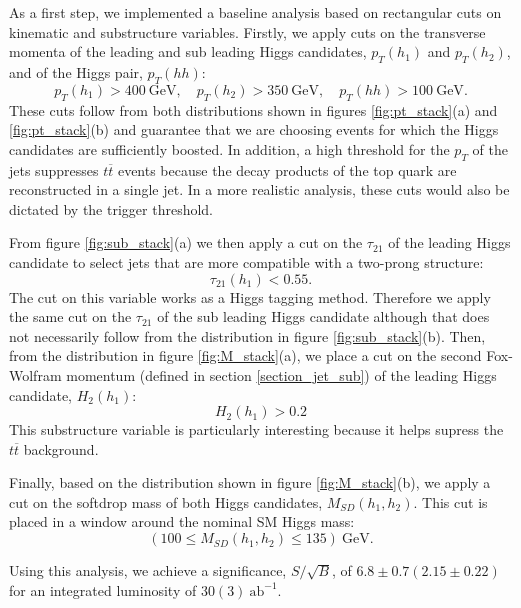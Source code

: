 As a first step, we implemented a baseline analysis based on rectangular cuts on kinematic and substructure variables. Firstly, we apply cuts on the transverse momenta of the leading and sub leading Higgs candidates, $p_T(h_1)$ and $p_T(h_2)$, and of the Higgs pair, $p_T(hh)$:
\begin{equation}
	p_T(h_1)>400 ~\text{GeV}, \quad p_T(h_2)>350 ~\text{GeV}, \quad p_T(hh)>100 ~\text{GeV}.
\end{equation}
These cuts follow from both distributions shown in figures \ref{fig:pt_stack}(a) and \ref{fig:pt_stack}(b) and guarantee that we are choosing events for which the Higgs candidates are sufficiently boosted. In addition, a high threshold for the $p_T$ of the jets suppresses $t\overline{t}$ events because the decay products of the top quark are reconstructed in a single jet. In a more realistic analysis, these cuts would also be dictated by the trigger threshold. 

From figure \ref{fig:sub_stack}(a) we then apply a cut on the $\tau_{21}$ of the leading Higgs candidate to select jets that are more compatible with a two-prong structure:
\begin{equation}
	\tau_{21}(h_1)<0.55.
\end{equation}
The cut on this variable works as a Higgs tagging method. Therefore we apply the same cut on the $\tau_{21}$ of the sub leading Higgs candidate although that does not necessarily follow from the distribution in figure \ref{fig:sub_stack}(b).
Then, from the distribution in figure \ref{fig:M_stack}(a), we place a cut on the second Fox-Wolfram momentum (defined in section \ref{section_jet_sub}) of the leading Higgs candidate, $H_2 (h_1)$:
\begin{equation}
	H_2 (h_1)>0.2
\end{equation}
This substructure variable is particularly interesting because it helps supress the $t\overline{t}$ background.

Finally, based on the distribution shown in figure \ref{fig:M_stack}(b), we apply a cut on the softdrop mass of both Higgs candidates, $M_{SD}(h_1,h_2)$. This cut is placed in a window around the nominal SM Higgs mass:
\begin{equation}
	(100\leq M_{SD}(h_1,h_2)\leq 135) ~\text{GeV}.
\end{equation}

Using this analysis, we achieve a significance, $S/\sqrt{B}$, of $6.8\pm0.7(2.15\pm0.22)$ for an integrated luminosity of $30(3)~\text{ab}^{-1}$.

